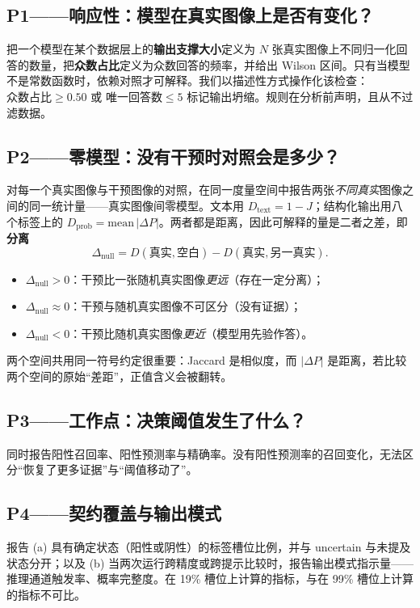 \subsection{P1——响应性：模型在真实图像上是否有变化？}

把一个模型在某个数据层上的\textbf{输出支撑大小}定义为 $N$ 张真实图像上不同归一化回答的数量，把\textbf{众数占比}定义为众数回答的频率，并给出 Wilson 区间。只有当模型不是常数函数时，依赖对照才可解释。我们以描述性方式操作化该检查：$\text{众数占比} \ge 0.50$ 或 $\text{唯一回答数} \le 5$ 标记输出坍缩。规则在分析前声明，且从不过滤数据。

\subsection{P2——零模型：没有干预时对照会是多少？}

对每一个真实图像与干预图像的对照，在同一度量空间中报告两张\emph{不同真实}图像之间的同一统计量——真实图像间零模型。文本用 $D_{\text{text}} = 1-J$；结构化输出用八个标签上的 $D_{\text{prob}} = \text{mean}\,|\Delta P|$。两者都是距离，因此可解释的量是二者之差，即\textbf{分离}
\[
\Delta_{\text{null}} = D(\text{真实},\text{空白}) - D(\text{真实},\text{另一真实}).
\]
\begin{itemize}[leftmargin=1.2em,itemsep=1pt,topsep=2pt]
\item $\Delta_{\text{null}} > 0$：干预比一张随机真实图像\emph{更远}（存在一定分离）；
\item $\Delta_{\text{null}} \approx 0$：干预与随机真实图像不可区分（没有证据）；
\item $\Delta_{\text{null}} < 0$：干预比随机真实图像\emph{更近}（模型用先验作答）。
\end{itemize}
两个空间共用同一符号约定很重要：Jaccard 是相似度，而 $|\Delta P|$ 是距离，若比较两个空间的原始``差距''，正值含义会被翻转。

\subsection{P3——工作点：决策阈值发生了什么？}

同时报告阳性召回率、阳性预测率与精确率。没有阳性预测率的召回变化，无法区分``恢复了更多证据''与``阈值移动了''。

\subsection{P4——契约覆盖与输出模式}

报告 (a) 具有确定状态（阳性或阴性）的标签槽位比例，并与 uncertain 与未提及状态分开；以及 (b) 当两次运行跨精度或跨提示比较时，报告输出模式指示量——推理通道触发率、概率完整度。在 19\% 槽位上计算的指标，与在 99\% 槽位上计算的指标不可比。

